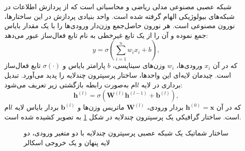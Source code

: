 شبکه عصبی مصنوعی مدلی ریاضی و محاسباتی است که از پردازش اطلاعات در شبکه‌های بیولوژیکی الهام گرفته شده است. واحد بنیادی پردازش در این ساختارها، نورون مصنوعی است. هر نورون حاصل‌جمع وزن‌دار ورودی‌ها را با یک مقدار بایاس جمع نموده و آن را از یک تابع غیرخطی به نام تابع فعال‌ساز عبور می‌دهد:
\begin{equation}
y = \sigma\left(\sum_{i=1}^{n} w_i x_i + b\right),
\label{eq:neuron}
\end{equation}
که در آن $x_i$ ورودی‌ها، $w_i$ وزن‌های سیناپسی، $b$ پارامتر بایاس و $\sigma(\cdot)$ تابع فعال‌ساز است. چیدمان لایه‌ای این واحدها، ساختار پرسپترون چندلایه را پدید می‌آورد. تبدیل برداری در لایه $l$ام به‌صورت رابطه بازگشتی زیر تعریف می‌شود:
\begin{equation}
\mathbf{h}^{(l)} = \sigma\left(\mathbf{W}^{(l)} \mathbf{h}^{(l-1)} + \mathbf{b}^{(l)}\right),
\label{eq:mlp}
\end{equation}
که در آن $\mathbf{h}^{(0)} = \mathbf{x}$ بردار ورودی، $\mathbf{W}^{(l)}$ ماتریس وزن‌ها و $\mathbf{b}^{(l)}$ بردار بایاس لایه $l$ام است. ساختار گرافیکی یک پرسپترون چندلایه در شکل \ref{fig:mlp} به تصویر کشیده شده است.

\begin{figure}[t]
\centering
\begin{latin}
\end{latin}
\caption{ساختار شماتیک یک شبکه عصبی پرسپترون چندلایه با دو متغیر ورودی، دو لایه پنهان و یک خروجی اسکالر}
\label{fig:mlp}
\end{figure}

